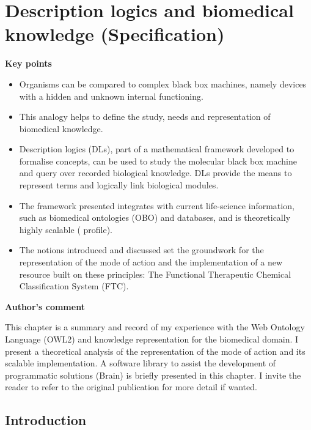 \chapter{Description logics and biomedical knowledge (Specification)}

\textbf{Key points}
\begin{itemize}
  \item Organisms can be compared to complex black box machines, namely devices with a hidden and unknown internal functioning.
  \item This analogy helps to define the study, needs and representation of biomedical knowledge.
  \item Description logics (DLs), part of a mathematical framework developed to formalise concepts, can be used to study the molecular black box machine and query over recorded biological knowledge. DLs provide the means to represent terms and logically link biological modules.
  \item The framework presented integrates with current life-science information, such as biomedical ontologies (OBO) and databases, and is theoretically highly scalable ( profile).
  \item The notions introduced and discussed set the groundwork for the representation of the mode of action and the implementation of a new resource built on these principles: The Functional Therapeutic Chemical Classification System (FTC).
\end{itemize}

\textbf{Author's comment}

This chapter is a summary and record of my experience with the Web Ontology Language (OWL2) and knowledge representation for the biomedical domain. I present a theoretical analysis of the representation of the mode of action and its scalable implementation. A software library to assist the development of programmatic solutions (Brain) is briefly presented in this chapter. I invite the reader to refer to the original publication \citep{croset2013brain} for more detail if wanted.

\hrulefill

\section{Introduction}

